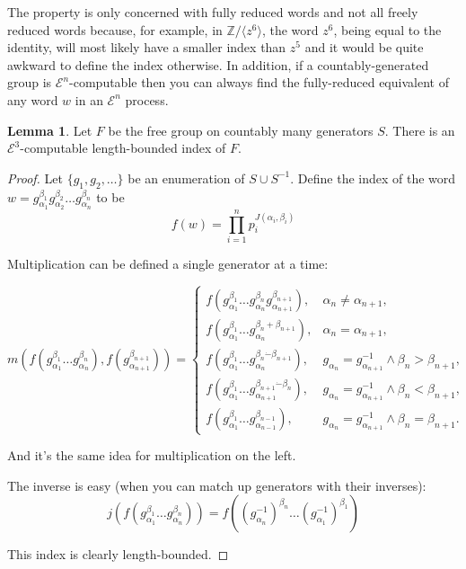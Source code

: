 \documentclass[a4paper]{article}
\newcommand{\grz}[1]{$\mathcal{E}^{#1}$}
\newcommand{\ZZ}{\mathbb{Z}}
\newcommand{\psub}{\dot -}
\theoremstyle{plain}
\theoremstyle{definition}
\newtheorem{lemma}[theorem]{Lemma}
\begin{document}
	The property is only concerned with fully reduced words and not all freely reduced words because, for example, in $\ZZ/\langle z^6 \rangle$, the word $z^6$, being equal to the identity, will most likely have a smaller index than $z^5$ and it would be quite awkward to define the index otherwise. In addition, if a countably-generated group is \grz{n}-computable then you can always find the fully-reduced equivalent of any word $w$ in an \grz{n} process.

\begin{lemma}\label{e3free}
	Let $F$ be the free group on countably many generators $S$. There is an \grz{3}-computable length-bounded index of $F$.
\end{lemma}
\begin{proof}
	Let $\{g_1,g_2,\dots\}$ be an enumeration of $S \cup S^{-1}$. Define the index of the word $w = g_{\alpha_1}^{\beta_1} g_{\alpha_2}^{\beta_2} \dots g_{\alpha_n}^{\beta_n}$ to be
	\[ f(w) = \prod_{i=1}^n p_i^{J(\alpha_i,\beta_i)} \]

	Multiplication can be defined a single generator at a time:
	\begin{doublespace}
	\[ m \left ( f(g_{\alpha_1}^{\beta_1} \dots g_{\alpha_n}^{\beta_n}), f(g_{\alpha_{n+1}}^{\beta_{n+1}}) \right ) = \left \{
	\begin{array}{lr}
		f(g_{\alpha_1}^{\beta_1} \dots g_{\alpha_n}^{\beta_n} g_{\alpha_{n+1}}^{\beta_{n+1}}),& \alpha_n \neq \alpha_{n+1}, \\
		f(g_{\alpha_1}^{\beta_1} \dots g_{\alpha_n}^{\beta_n + \beta_{n+1}}),									& \alpha_n = \alpha_{n+1}, \\
		f(g_{\alpha_1}^{\beta_1} \dots g_{\alpha_n}^{\beta_n \psub \beta_{n+1}}),									& g_{\alpha_n} = g_{\alpha_{n+1}}^{-1} \wedge \beta_n > \beta_{n+1}, \\
		f(g_{\alpha_1}^{\beta_1} \dots g_{\alpha_{n+1}}^{\beta_{n+1} \psub \beta_{n}}),						& g_{\alpha_n} = g_{\alpha_{n+1}}^{-1} \wedge \beta_n < \beta_{n+1}, \\
		f(g_{\alpha_1}^{\beta_1} \dots g_{\alpha_{n-1}}^{\beta_{n-1}}),												& g_{\alpha_n} = g_{\alpha_{n+1}}^{-1} \wedge \beta_n = \beta_{n+1}.
	\end{array} \right . \]
	\end{doublespace}

	And it's the same idea for multiplication on the left.

	The inverse is easy (when you can match up generators with their inverses):
	\[ j(f(g_{\alpha_1}^{\beta_1} \dots g_{\alpha_n}^{\beta_n})) = f((g_{\alpha_n}^{-1})^{\beta_n} \dots (g_{\alpha_1}^{-1})^{\beta_1}) \]

	This index is clearly length-bounded.
\end{proof}
\end{document}
